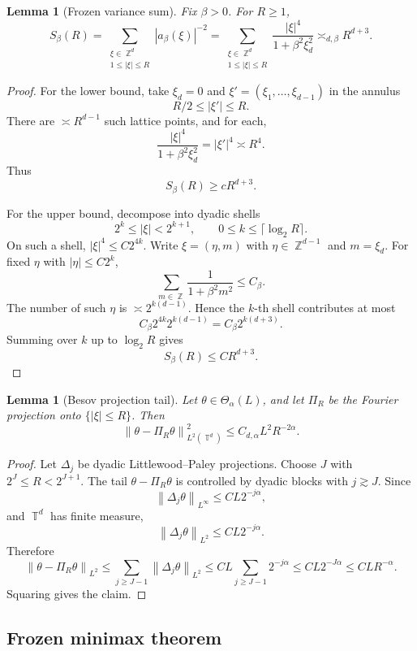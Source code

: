 \documentclass[12pt]{article}
\newtheorem{lemma}[theorem]{Lemma}
\theoremstyle{remark}
\DeclareMathOperator{\Z}{\mathbb Z}
\DeclareMathOperator{\T}{\mathbb T}
\newcommand{\norm}[1]{\left\lVert #1\right\rVert}
\newcommand{\asym}{\asymp}
\begin{document}
\begin{lemma}[Frozen variance sum]
\label{lem:frozen-variance}
Fix \(\beta>0\). For \(R\ge1\),
\[
S_\beta(R)
=
\sum_{\substack{\xi\in\Z^d\\1\le|\xi|\le R}}
|a_\beta(\xi)|^{-2}
=
\sum_{\substack{\xi\in\Z^d\\1\le|\xi|\le R}}
\frac{|\xi|^4}{1+\beta^2\xi_d^2}
\asym_{d,\beta}
R^{d+3}.
\]
\end{lemma}
\begin{proof}
For the lower bound, take \(\xi_d=0\) and \(\xi'=(\xi_1,\dots,\xi_{d-1})\) in the annulus
\[
R/2\le |\xi'|\le R.
\]
There are \(\asym R^{d-1}\) such lattice points, and for each,
\[
\frac{|\xi|^4}{1+\beta^2\xi_d^2}
=
|\xi'|^4
\asym R^4.
\]
Thus
\[
S_\beta(R)\ge cR^{d+3}.
\]

For the upper bound, decompose into dyadic shells
\[
2^k\le |\xi|<2^{k+1},
\qquad
0\le k\le \lceil\log_2 R\rceil.
\]
On such a shell, \(|\xi|^4\le C2^{4k}\). Write \(\xi=(\eta,m)\) with \(\eta\in\Z^{d-1}\) and \(m=\xi_d\). For fixed \(\eta\) with \(|\eta|\le C2^k\),
\[
\sum_{m\in\Z}\frac{1}{1+\beta^2m^2}
\le
C_\beta.
\]
The number of such \(\eta\) is \(\asym 2^{k(d-1)}\). Hence the \(k\)-th shell contributes at most
\[
C_\beta 2^{4k}2^{k(d-1)}
=
C_\beta 2^{k(d+3)}.
\]
Summing over \(k\) up to \(\log_2 R\) gives
\[
S_\beta(R)\le C R^{d+3}.
\]
\end{proof}

\begin{lemma}[Besov projection tail]
\label{lem:besov-tail}
Let \(\theta\in\Theta_\alpha(L)\), and let \(\Pi_R\) be the Fourier projection onto \(\{|\xi|\le R\}\). Then
\[
\norm{\theta-\Pi_R\theta}_{L^2(\T^d)}^2
\le
C_{d,\alpha}L^2R^{-2\alpha}.
\]
\end{lemma}
\begin{proof}
Let \(\Delta_j\) be dyadic Littlewood--Paley projections. Choose \(J\) with \(2^J\le R<2^{J+1}\). The tail \(\theta-\Pi_R\theta\) is controlled by dyadic blocks with \(j\gtrsim J\). Since
\[
\norm{\Delta_j\theta}_{L^\infty}
\le
CL2^{-j\alpha},
\]
and \(\T^d\) has finite measure,
\[
\norm{\Delta_j\theta}_{L^2}
\le
CL2^{-j\alpha}.
\]
Therefore
\[
\norm{\theta-\Pi_R\theta}_{L^2}
\le
\sum_{j\ge J-1}\norm{\Delta_j\theta}_{L^2}
\le
CL\sum_{j\ge J-1}2^{-j\alpha}
\le
CL2^{-J\alpha}
\le
CLR^{-\alpha}.
\]
Squaring gives the claim.
\end{proof}

\subsection{Frozen minimax theorem}
\end{document}
